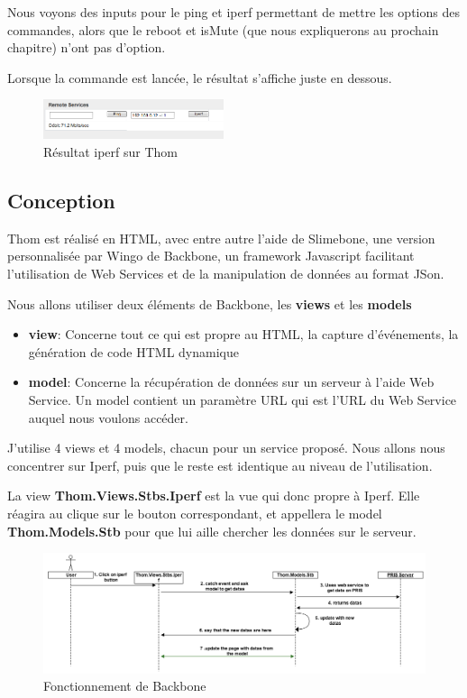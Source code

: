 Nous voyons des inputs pour le ping et iperf permettant de mettre les options des commandes, alors que le reboot et isMute (que nous expliquerons au prochain chapitre) n'ont pas d'option.

\medskip

Lorsque la commande est lancée, le résultat s'affiche juste en dessous.
\begin{figure}[H]
      \centering
      \includegraphics[width=200px]{00_media/thom_result}
      \caption{Résultat iperf sur Thom}
      \label{gra:maqmenu}
\end{figure}

\subsection{Conception}
Thom est réalisé en HTML, avec entre autre l'aide de Slimebone, une version personnalisée par Wingo de Backbone, un framework Javascript facilitant l'utilisation de Web Services et de la manipulation de données au format JSon.

Nous allons utiliser deux éléments de Backbone, les \textbf{views} et les \textbf{models}
\begin{itemize}
	\item \textbf{view}: Concerne tout ce qui est propre au HTML, la capture d'événements, la génération de code HTML dynamique
	\item \textbf{model}: Concerne la récupération de données sur un serveur à l'aide Web Service. Un model contient un paramètre URL qui est l'URL du Web Service auquel nous voulons accéder.
\end{itemize}

J'utilise 4 views et 4 models, chacun pour un service proposé. Nous allons nous concentrer sur Iperf, puis que le reste est identique au niveau de l'utilisation.

\medskip

La view \textbf{Thom.Views.Stbs.Iperf} est la vue qui donc propre à Iperf. Elle réagira au clique sur le bouton correspondant, et appellera le model \textbf{Thom.Models.Stb} pour que lui aille chercher les données sur le serveur.

\begin{figure}[H]
      \centering
      \includegraphics[width=\textwidth]{00_media/backbone_working}
      \caption{Fonctionnement de Backbone}
      \label{gra:maqmenu}
\end{figure}

